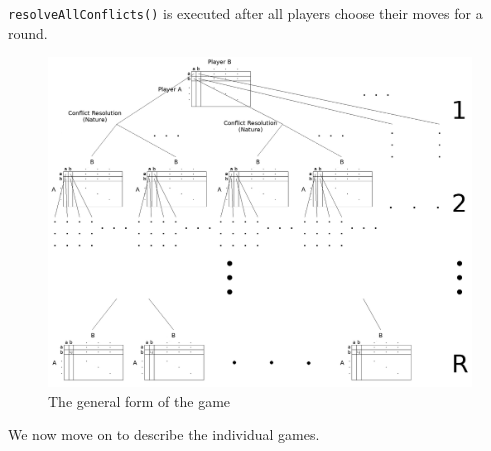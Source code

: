  \noindent \texttt{resolveAllConflicts()} is executed after all players choose their moves for a round.

  \begin{figure}[h]
  \label{fig:game}
    \centering
    \includegraphics[width=\textwidth]{game}
    \caption{The general form of the game \cite{sgtm}}
  \end{figure}
  
  \noindent We now move on to describe the individual games.

